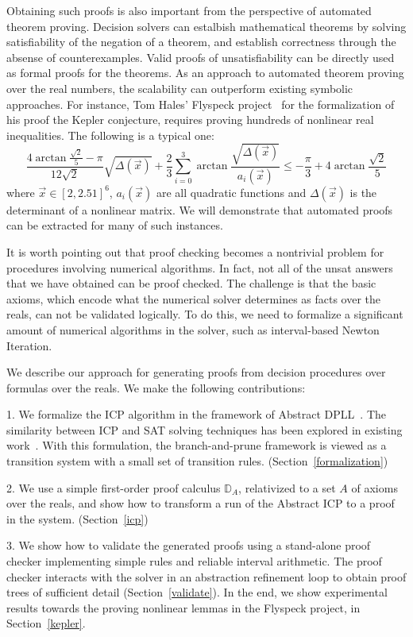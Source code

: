 \documentclass{llncs}
\begin{document}
Obtaining such proofs is also important from the perspective of automated theorem proving. Decision solvers can estalbish mathematical theorems by solving satisfiability of the negation of a theorem, and establish correctness through the absense of counterexamples. Valid proofs of unsatisfiability can be directly used as formal proofs for the theorems. As an approach to automated theorem proving over the real numbers, the scalability can outperform existing symbolic approaches. For instance, Tom Hales' Flyspeck project~\cite{DBLP:conf/dagstuhl/Hales05,DBLP:journals/dcg/HalesHMNOZ10} for the formalization of his proof the Kepler conjecture, requires proving hundreds of nonlinear real inequalities. The following is a typical one:
$$\frac{4\arctan\frac{\sqrt 2}{5}-\pi}{12\sqrt2}\sqrt{\Delta(\vec x)}+\frac{2}{3}\sum_{i=0}^3\arctan\frac{\sqrt{\Delta(\vec x)}}{a_i(\vec x)}\leq -\frac{\pi}{3}+4\arctan\frac{\sqrt 2}{5}$$
where $\vec x\in [2, 2.51]^6$,  $a_i(\vec x)$ are all quadratic functions and $\Delta(\vec x)$ is the determinant of a nonlinear matrix. We will demonstrate that automated proofs can be extracted for many of such instances.

It is worth pointing out that proof checking becomes a nontrivial problem for procedures involving numerical algorithms. In fact, not all of the {\sf unsat} answers that we have obtained can be proof checked. The challenge is that the basic axioms, which encode what the numerical solver determines as facts over the reals, can not be validated logically. To do this, we need to formalize a significant amount of numerical algorithms in the solver, such as interval-based Newton Iteration.

We describe our approach for generating proofs from decision procedures over formulas over the reals. We make the following contributions:

1. We formalize the ICP algorithm in the framework of Abstract DPLL~\cite{DBLP:journals/jacm/NieuwenhuisOT06}. The similarity between ICP and SAT solving techniques has been explored in existing work~\cite{HySAT}. With this formulation, the branch-and-prune framework is viewed as a transition system with a small set of transition rules. (Section~\ref{formalization})

2. We use a simple first-order proof calculus $\mathbb{D}_A$, relativized to a set $A$ of axioms over the reals, and show how to transform a run of the Abstract ICP to a proof in the system. (Section~\ref{icp})

3. We show how to validate the generated proofs using a stand-alone proof checker implementing simple rules and reliable interval arithmetic. The proof checker interacts with the solver in an abstraction refinement loop to obtain proof trees of sufficient detail (Section~\ref{validate}). In the end, we show experimental results towards the proving nonlinear lemmas in the Flyspeck project, in Section~\ref{kepler}.
\end{document}
